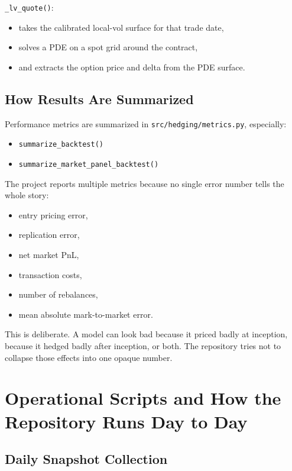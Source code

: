 \documentclass[11pt]{article}
\begin{document}
\texttt{\_lv\_quote()}:

\begin{itemize}
  \item takes the calibrated local-vol surface for that trade date,
  \item solves a PDE on a spot grid around the contract,
  \item and extracts the option price and delta from the PDE surface.
\end{itemize}

\subsection{How Results Are Summarized}

Performance metrics are summarized in
\texttt{src/hedging/metrics.py}, especially:

\begin{itemize}
  \item \texttt{summarize\_backtest()}
  \item \texttt{summarize\_market\_panel\_backtest()}
\end{itemize}

The project reports multiple metrics because no single error number tells the whole story:

\begin{itemize}
  \item entry pricing error,
  \item replication error,
  \item net market PnL,
  \item transaction costs,
  \item number of rebalances,
  \item mean absolute mark-to-market error.
\end{itemize}

This is deliberate. A model can look bad because it priced badly at inception, because it hedged badly after inception, or both. The repository tries not to collapse those effects into one opaque number.

\section{Operational Scripts and How the Repository Runs Day to Day}

\subsection{Daily Snapshot Collection}
\end{document}
